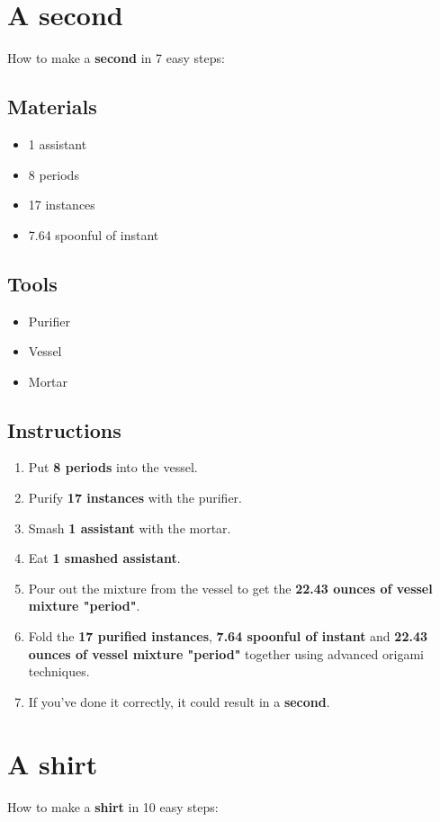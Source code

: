 \documentclass{article}
\begin{document}
\section{A second}How to make a \textbf{second} in 7 easy steps:

\subsection{Materials}\begin{itemize}
\item 
1 assistant
\item 
8 periods
\item 
17 instances
\item 
7.64 spoonful of instant
\end{itemize}
\subsection{Tools}\begin{itemize}
\item 
Purifier
\item 
Vessel
\item 
Mortar
\end{itemize}
\subsection{Instructions}\begin{enumerate}
\item 
Put \textbf{8 periods} into the vessel.
\item 
Purify \textbf{17 instances} with the purifier.
\item 
Smash \textbf{1 assistant} with the mortar.
\item 
Eat \textbf{1 smashed assistant}.
\item 
Pour out the mixture from the vessel to get the \textbf{22.43 ounces of vessel mixture "period"}.
\item 
Fold the \textbf{17 purified instances}, \textbf{7.64 spoonful of instant} and \textbf{22.43 ounces of vessel mixture "period"} together using advanced origami techniques.
\item 
If you've done it correctly, it could result in a \textbf{second}.
\end{enumerate}
\newpage
\section{A shirt}How to make a \textbf{shirt} in 10 easy steps:
\end{document}

